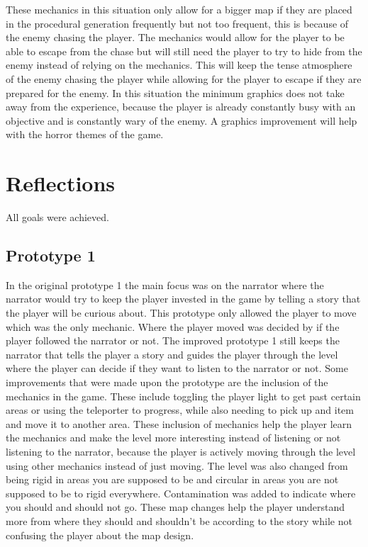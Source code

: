 \documentclass{article}
\begin{document}
These mechanics in this situation only allow for a bigger map if they are placed in the procedural generation
frequently but not too frequent, this is because of the enemy chasing the player. The mechanics would allow for the player
to be able to escape from the chase but will still need the player to try to hide from the enemy instead of relying on
the mechanics. This will keep the tense atmosphere of the enemy chasing the player while allowing for the player to escape
if they are prepared for the enemy. In this situation the minimum graphics does not take away from the experience, because
the player is already constantly busy with an objective and is constantly wary of the enemy. A graphics improvement will
help with the horror themes of the game.

\section{Reflections}
All goals were achieved.
\subsection{Prototype 1}
In the original prototype 1 the main focus was on the narrator where the narrator would try to keep the player
invested in the game by telling a story that the player will be curious about. This prototype only allowed the player to
move which was the only mechanic. Where the player moved was decided by if the player followed the narrator or not.
The improved prototype 1 still keeps the narrator that tells the player a story and guides the player through the
level where the player can decide if they want to listen to the narrator or not. 
Some improvements that were made upon the prototype are the inclusion of the mechanics in the game. 
These include toggling the player light to get past certain areas or using the teleporter to progress, 
while also needing to pick up and item and move it to another area. These inclusion of mechanics help the player learn 
the mechanics and make the level more interesting instead of listening or not listening to the narrator, 
because the player is actively moving through the level using other mechanics instead of just moving.
The level was also changed from being rigid in areas you are supposed to be and circular in areas you are not supposed to
be to rigid everywhere. Contamination was added to indicate where you should and should not go. These map changes help the player
understand more from where they should and shouldn't be according to the story while not confusing the player about the 
map design.
\end{document}
